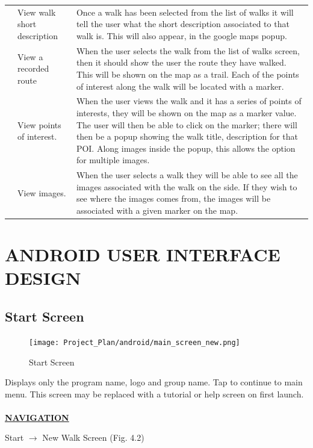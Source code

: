 \documentclass[12pt]{article}
\begin{document}
\begin{longtable}{|p{2cm}|p{3cm}|p{10cm}|}
\\\cline{2-3} & \multicolumn{1}{|p{3cm}|}{View walk short description}& \multicolumn{1}{|p{10cm}|}{Once a walk has been selected from the list of walks it will tell the user what the short description associated to that walk is. This will also appear, in the google maps popup.}
\\\cline{2-3} & \multicolumn{1}{|p{3cm}|}{View a recorded route}& \multicolumn{1}{|p{10cm}|}{When the user selects the walk from the list of walks screen, then it should show the user the route they have walked. This will be shown on the map as a trail. Each of the points of interest along the walk will be located with a marker.}
\\\cline{2-3} & \multicolumn{1}{|p{3cm}|}{View points of interest.}& \multicolumn{1}{|p{10cm}|}{When the user views the walk and it has a series of points of interests, they will be shown on the map as a marker value. The user will then be able to click on the marker; there will then be a popup showing the walk title, description for that POI. Along images inside the popup, this allows the option for multiple images.}
\\\cline{2-3} & \multicolumn{1}{|p{3cm}|}{View images.}& \multicolumn{1}{|p{10cm}|}{When the user selects a walk they will be able to see all the images associated with the walk on the side. If they wish to see where the images comes from, the images will be associated with a given marker on the map.}
\\\hline
\end{longtable}
\newpage
\section{ANDROID USER INTERFACE DESIGN}
\subsection{Start Screen}
\begin{figure}[htp]
\centering
\texttt{[image: Project\_Plan/android/main\_screen\_new.png]}
\caption{Start Screen}
\label{Start Screen}
\end{figure}
Displays only the program name, logo and group name. Tap to continue to main menu. This screen may be replaced with a tutorial or help screen on first launch. \\\\
\textbf{\uline{NAVIGATION}}
\par{Start $\rightarrow$ New Walk Screen (Fig. 4.2)} 
\clearpage
\end{document}
